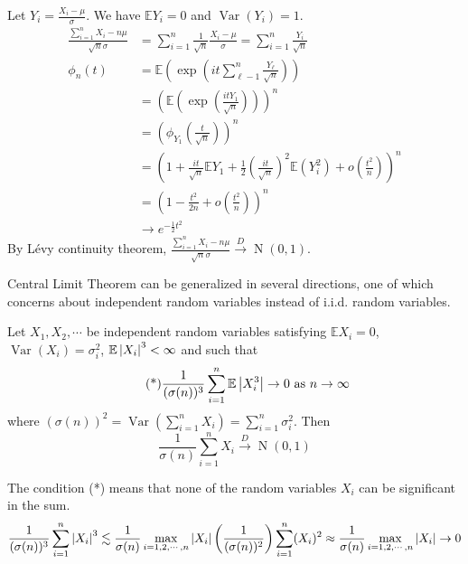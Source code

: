 \documentclass{huhtakm-template-book}
\newcommand{\expect}{\mathbb{E}}
\DeclareMathOperator{\N}{N}
\DeclareMathOperator{\Var}{Var}
\begin{document}
\begin{proofing}
	Let $Y_{i}=\frac{X_{i}-\mu}{\sigma}$. We have $\expect Y_{i}=0$ and $\Var(Y_{i})=1$.
	\begin{align*}
		\frac{\sum_{i=1}^{n}X_{i}-n\mu}{\sqrt{n}\sigma}&=\sum_{i=1}^{n}\frac{1}{\sqrt{n}}\frac{X_{i}-\mu}{\sigma}=\sum_{i=1}^{n}\frac{Y_{i}}{\sqrt{n}}\\
		\phi_{n}(t)&=\expect\left(\exp\left(it\sum_{\ell-1}^{n}\frac{Y_{\ell}}{\sqrt{n}}\right)\right)\\
		&=\left(\expect\left(\exp\left(\frac{itY_{1}}{\sqrt{n}}\right)\right)\right)^{n}\\
		&=\left(\phi_{Y_{1}}\left(\frac{t}{\sqrt{n}}\right)\right)^{n}\\
		\tag{Taylor expansion}
		&=\left(1+\frac{it}{\sqrt{n}}\expect Y_{1}+\frac{1}{2}\left(\frac{it}{\sqrt{n}}\right)^{2}\expect(Y_{i}^{2})+o\left(\frac{t^{2}}{n}\right)\right)^{n}\\
		&=\left(1-\frac{t^{2}}{2n}+o\left(\frac{t^{2}}{n}\right)\right)^{n}\\
		&\to e^{-\frac{1}{2}t^{2}}
	\end{align*}
	By L\'evy continuity theorem, $\frac{\sum_{i=1}^{n}X_{i}-n\mu}{\sqrt{n}\sigma}\xrightarrow{D}\N(0,1)$.
\end{proofing}
\newpage
Central Limit Theorem can be generalized in several directions, one of which concerns about independent random variables instead of i.i.d. random variables.
\begin{thm}
	Let $X_{1},X_{2},\cdots$ be independent random variables satisfying $\expect X_{i}=0$, $\Var(X_{i})=\sigma_{i}^{2}$, $\expect\abs{X_{i}}^{3}<\infty$ and such that
	\begin{equation*}
		\tag{*}
		\frac{1}{(\sigma(n))^{3}}\sum_{i=1}^{n}\expect\abs{X_{i}^{3}}\to 0 \text{ as }n\to\infty
	\end{equation*}
	where $(\sigma(n))^{2}=\Var(\sum_{i=1}^{n}X_{i})=\sum_{i=1}^{n}\sigma_{i}^{2}$. Then
	\begin{equation*}
		\frac{1}{\sigma(n)}\sum_{i=1}^{n}X_{i}\xrightarrow{D}\N(0,1)
	\end{equation*}
\end{thm}
\begin{rem}
	The condition (*) means that none of the random variables $X_{i}$ can be significant in the sum.
	\begin{equation*}
		\frac{1}{(\sigma(n))^{3}}\sum_{i=1}^{n}\left|{X_{i}}\right|^{3}\lesssim\frac{1}{\sigma(n)}\max_{i=1,2,\cdots,n}\left|{X_{i}}\right|\left(\frac{1}{(\sigma(n))^{2}}\right)\sum_{i=1}^{n}(X_{i})^{2}\approx\frac{1}{\sigma(n)}\max_{i=1,2,\cdots,n}\left|{X_{i}}\right|\to 0
	\end{equation*}
\end{rem}
\end{document}
